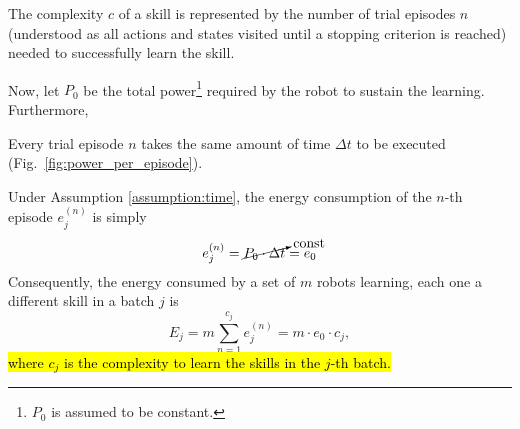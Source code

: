 \begin{tcolorbox}
\begin{definition}\label{definition:complexity} The complexity $c$ of a skill is represented by the number of trial episodes $n$ (understood as all actions and states visited until a stopping criterion is reached) needed to successfully learn the skill. 
\end{definition}
\end{tcolorbox}
Now, let $P_0$ be the total power\footnote{$P_0$ is assumed to be constant.} required by the robot to sustain the learning. Furthermore,
\begin{tcolorbox}
\begin{assumption}\label{assumption:time} Every trial episode $n$ takes the same amount of time $\Delta t$ to be executed (Fig.~\ref{fig:power_per_episode}).
\end{assumption}
\end{tcolorbox}
Under Assumption \ref{assumption:time}, the energy consumption of the $n$-th episode $e^{(n)}_j$ is simply
\begin{equation}\label{eq:energy_per_episode}
    e^{(n)}_j = \cancelto{\text{const}}{P_0\cdot \Delta t} = e_0
\end{equation}
Consequently, the energy consumed by a set of $m$ robots learning, each one a different skill in a batch $j$ is
\begin{equation}\label{eq:energy_per_task}
    E_j =m \sum_{n=1}^{c_j} e^{(n)}_j = m \cdot e_0 \cdot c_j,
\end{equation}
\hl{where $c_j$ is the complexity to learn the skills in the $j$-th batch.}

